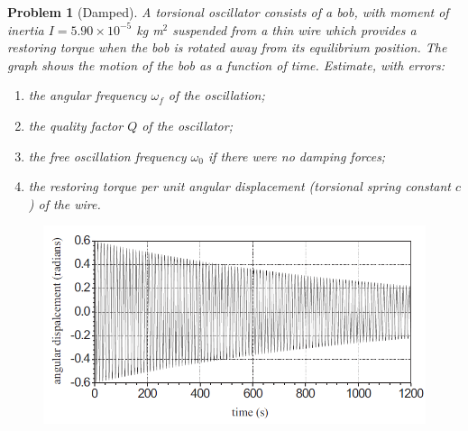 \documentclass[a4paper]{article}
\theoremstyle{new}
\newtheorem{qns}{Problem}[section]
\begin{document}
\newpage
\begin{qns}[Damped]
A torsional oscillator consists of a bob, with moment of inertia $I=5.90\times10^{-5}$ kg m$^2$ suspended from a thin wire which provides a restoring torque when the bob is rotated away from its equilibrium position. The graph shows the motion of the bob as a function of time. Estimate, with errors:
\begin{enumerate}[label=(\alph*)]
    \item the angular frequency $\omega_f$ of the oscillation;
    \item the quality factor $Q$ of the oscillator;
    \item the free oscillation frequency $\omega_0$ if there were no damping forces;
    \item the restoring torque per unit angular displacement (torsional spring constant $c$) of the wire.
\end{enumerate}
\begin{figure}[H]
    \centering
    \includegraphics[width=\linewidth]{2_2.PNG}
\end{figure}
\end{qns}
\end{document}
